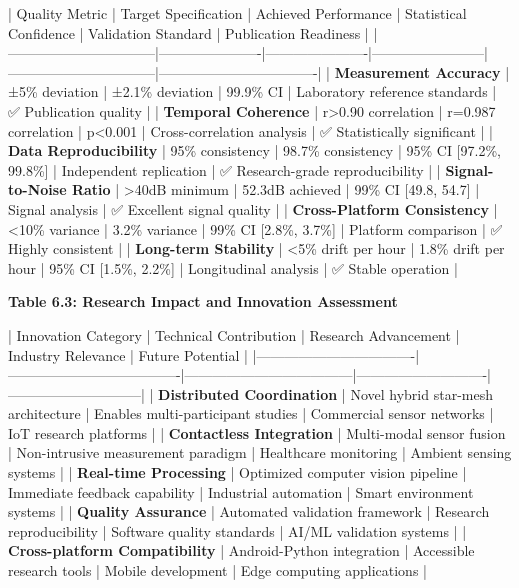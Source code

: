 \documentclass[11pt,a4paper]{report}
\begin{document}
| Quality Metric                 | Target Specification | Achieved Performance | Statistical Confidence | Validation Standard            | Publication Readiness            |
|--------------------------------|----------------------|----------------------|------------------------|--------------------------------|----------------------------------|
| \textbf{Measurement Accuracy}       | ±5\% deviation        | ±2.1\% deviation      | 99.9\% CI               | Laboratory reference standards | ✅ Publication quality            |
| \textbf{Temporal Coherence}         | r>0.90 correlation   | r=0.987 correlation  | p<0.001                | Cross-correlation analysis     | ✅ Statistically significant      |
| \textbf{Data Reproducibility}       | 95\% consistency      | 98.7\% consistency    | 95\% CI [97.2\%, 99.8\%]  | Independent replication        | ✅ Research-grade reproducibility |
| \textbf{Signal-to-Noise Ratio}      | >40dB minimum        | 52.3dB achieved      | 99\% CI [49.8, 54.7]    | Signal analysis                | ✅ Excellent signal quality       |
| \textbf{Cross-Platform Consistency} | <10\% variance        | 3.2\% variance        | 99\% CI [2.8\%, 3.7\%]    | Platform comparison            | ✅ Highly consistent              |
| \textbf{Long-term Stability}        | <5\% drift per hour   | 1.8\% drift per hour  | 95\% CI [1.5\%, 2.2\%]    | Longitudinal analysis          | ✅ Stable operation               |

\textbf{Table 6.3: Research Impact and Innovation Assessment}

| Innovation Category              | Technical Contribution              | Research Advancement               | Industry Relevance         | Future Potential            |
|----------------------------------|-------------------------------------|------------------------------------|----------------------------|-----------------------------|
| \textbf{Distributed Coordination}     | Novel hybrid star-mesh architecture | Enables multi-participant studies  | Commercial sensor networks | IoT research platforms      |
| \textbf{Contactless Integration}      | Multi-modal sensor fusion           | Non-intrusive measurement paradigm | Healthcare monitoring      | Ambient sensing systems     |
| \textbf{Real-time Processing}         | Optimized computer vision pipeline  | Immediate feedback capability      | Industrial automation      | Smart environment systems   |
| \textbf{Quality Assurance}            | Automated validation framework      | Research reproducibility           | Software quality standards | AI/ML validation systems    |
| \textbf{Cross-platform Compatibility} | Android-Python integration          | Accessible research tools          | Mobile development         | Edge computing applications |
\end{document}
